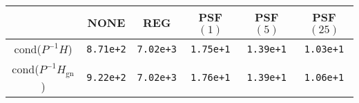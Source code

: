 \begin{table}[H]
\begin{center}
    \begingroup
    \setlength{\tabcolsep}{8pt}
    \renewcommand{\arraystretch}{1.25}
    \begin{tabular}{c| c c c c c}
             & NONE & REG & PSF $(1)$ & PSF $(5)$ & PSF $(25)$ \\
        \hline
        cond($P^{-1}H$) &
        \verb~8.71e+2~ & \verb~7.02e+3~ & \verb~1.75e+1~ & \verb~1.39e+1~ & \verb~1.03e+1~ \\
        cond($P^{-1}H_{\text{gn}}$) &
        \verb~9.22e+2~ & \verb~7.02e+3~ & \verb~1.76e+1~ & \verb~1.39e+1~ & \verb~1.06e+1~
    \end{tabular}
    \endgroup
\end{center}
\end{table}
